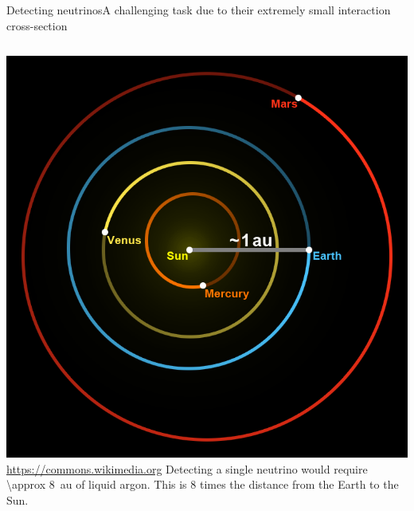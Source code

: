 \documentclass[]{beamer}
\newcommand*{\emphcol}{red}
\begin{document}
\begin{frame}{Detecting neutrinos}{A challenging task due to their extremely small interaction cross-section}
	\begin{columns}[c]
		\centering
		\includegraphics[width=\textwidth]{defence/Astronomical_unit}\\
		{\tiny\url{https://commons.wikimedia.org}}
		Detecting a single neutrino would require {\color{\emphcol}\SI{\approx 8}{au}} of liquid argon.
		This is \num{8} times the distance from the Earth to the Sun.
	\end{columns}
\end{frame}
\end{document}
